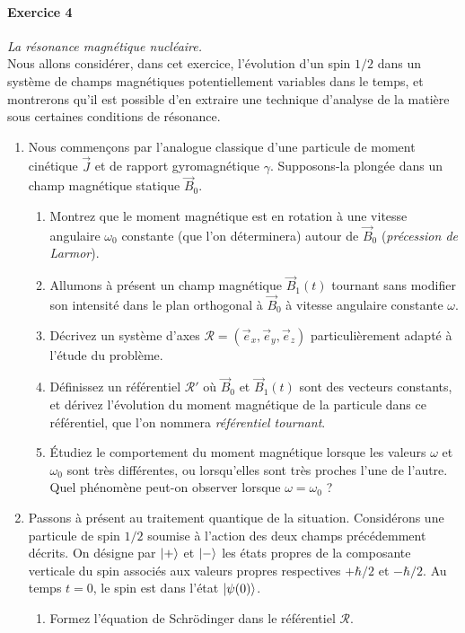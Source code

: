 \paragraph{Exercice 4} \textit{La résonance magnétique nucléaire.} \\
Nous allons considérer, dans cet exercice, l'évolution d'un spin $1/2$ dans un système de champs magnétiques potentiellement variables dans le temps, et montrerons qu'il est possible d'en extraire une technique d'analyse de la matière sous certaines conditions de résonance. 
\begin{enumerate}
\item Nous commençons par l'analogue classique d'une particule de moment cinétique $\vec J$ et de rapport gyromagnétique $\gamma$. Supposons-la plongée dans un champ magnétique statique $\vec B_0$.
\begin{enumerate}
\item Montrez que le moment magnétique est en rotation à une vitesse angulaire $\omega_0$ constante (que l'on déterminera) autour de $\vec B_0$ (\textit{précession de Larmor}).
\item Allumons à présent un champ magnétique $\vec B_1(t)$ tournant sans modifier son intensité dans le plan orthogonal à $\vec B_0$ à vitesse angulaire constante $\omega$. \item Décrivez un système d'axes $\mathcal R = (\vec e_x,\vec e_y,\vec e_z)$ particulièrement adapté à l'étude du problème.
\item Définissez un référentiel $\mathcal R'$ où $\vec B_0$ et $\vec B_1(t)$ sont des vecteurs constants, et dérivez l'évolution du moment magnétique de la particule dans ce référentiel, que l'on nommera \textit{référentiel tournant}.
\item Étudiez le comportement du moment magnétique lorsque les valeurs $\omega$ et $\omega_0$ sont très différentes, ou lorsqu'elles sont très proches l'une de l'autre. Quel phénomène peut-on observer lorsque $\omega = \omega_0$ ?
\end{enumerate}
\item Passons à présent au traitement quantique de la situation. Considérons une particule de spin $1/2$ soumise à l'action des deux champs précédemment décrits. On désigne par $\ket{+}$ et $\ket{-}$ les états propres de la composante verticale du spin associés aux valeurs propres respectives $+\hbar/2$ et $-\hbar/2$. Au temps $t=0$, le spin est dans l'état $\ket{\psi(0)}$.
\begin{enumerate}
\item Formez l'équation de Schrödinger dans le référentiel $\mathcal R$. 

\end{enumerate}
\end{enumerate}
